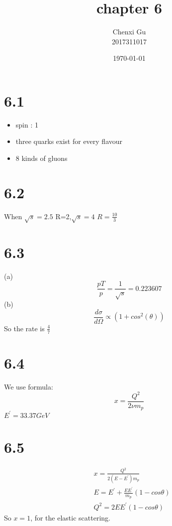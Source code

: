 \documentclass{article}
\begin{document}
\begin{CJK*}{GBK}{song}

\pagestyle{fancy}  
\fancyhead{} %
\renewcommand{\headrulewidth}{0.4pt}  
\renewcommand{\footrulewidth}{0.4pt} 



\title {chapter 6}
\author{Chenxi Gu\\2017311017}

\date{\today}

\maketitle
\section{6.1}
\begin{itemize}
\item spin : 1
\item three quarks exist for every flavour
\item 8 kinds of gluons
\end{itemize}

\section{6.2}
When $\sqrt{s}=2.5$ R=2,$\sqrt{s}=4$ $R=\frac{10}{3}$

\section{6.3}
(a)
\begin{equation}
\frac{pT}{p}=\frac{1}{\sqrt{s}}=0.223607
\end{equation}
(b)
\begin{equation}
\frac{d\sigma}{d\Omega}\propto(1+cos^2(\theta))
\end{equation}
So the rate is $\frac{4}{7}$

\section{6.4}
We use formula:
\begin{equation}
x=\frac{Q^2}{2\nu m_p}
\end{equation}
$E^{'}=33.37GeV$
\section{6.5}
\begin{equation}
\begin{aligned}
&x=\frac{Q^2}{2(E-E^{'})m_p}\\
&E=E^{'}+\frac{EE^{'}}{m_p}(1-cos\theta)\\
&Q^2=2EE^{'}(1-cos\theta)
\end{aligned}
\end{equation}
So $x=1$, for the elastic scattering.


\end{CJK*}
\end{document}
